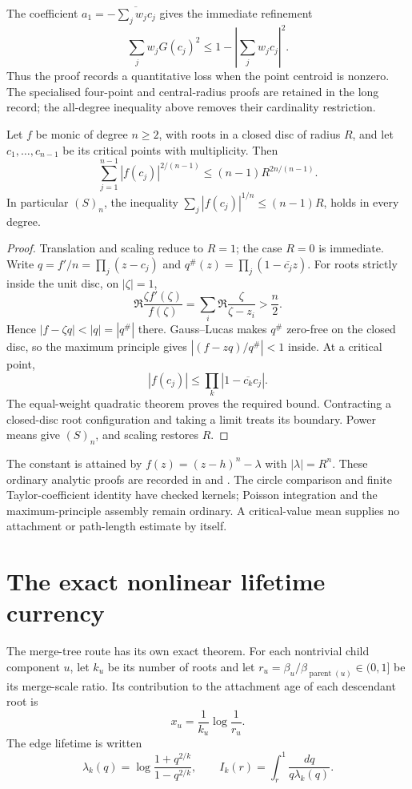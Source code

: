 \documentclass[11pt]{article}
\begin{document}
The coefficient $a_1=-\overline{\sum_jw_jc_j}$ gives the immediate refinement
\[
 \sum_jw_jG(c_j)^2\le1-\left|\sum_jw_jc_j\right|^2.
\]
Thus the proof records a quantitative loss when the point centroid is nonzero.
The specialised four-point and central-radius proofs are retained in the long
record; the all-degree inequality above removes their cardinality restriction.

\begin{theorem}\label{res:fp-to-s}
Let $f$ be monic of degree $n\ge2$, with roots in a closed disc of radius
$R$, and let $c_1,\ldots,c_{n-1}$ be its critical points with multiplicity.
Then
\[
 \sum_{j=1}^{n-1}|f(c_j)|^{2/(n-1)}
 \le(n-1)R^{2n/(n-1)}.
\]
In particular $(S)_n$, the inequality
$\sum_j|f(c_j)|^{1/n}\le(n-1)R$, holds in every degree.
\end{theorem}

\begin{proof}
Translation and scaling reduce to $R=1$; the case $R=0$ is immediate.
Write $q=f'/n=\prod_j(z-c_j)$ and
$q^\#(z)=\prod_j(1-\overline{c_j}z)$.
For roots strictly inside the unit disc, on $|\zeta|=1$,
\[
 \Re\frac{\zeta f'(\zeta)}{f(\zeta)}
 =\sum_i\Re\frac{\zeta}{\zeta-z_i}>\frac n2.
\]
Hence $|f-\zeta q|<|q|=|q^\#|$ there.  Gauss--Lucas makes $q^\#$ zero-free
on the closed disc, so the maximum principle gives
$|(f-zq)/q^\#|<1$ inside.  At a critical point,
\[
 |f(c_j)|\le\prod_k|1-\overline{c_k}c_j|.
\]
The equal-weight quadratic theorem proves the required bound.
Contracting a closed-disc root configuration and taking a limit treats its
boundary.  Power means give $(S)_n$, and scaling restores $R$.
\end{proof}

The constant is attained by $f(z)=(z-h)^n-\lambda$ with $|\lambda|=R^n$.
These ordinary analytic proofs are recorded in
 and
.
The circle comparison and finite Taylor-coefficient identity have checked
kernels; Poisson integration and the maximum-principle assembly remain ordinary.
A critical-value mean supplies no attachment or path-length estimate by itself.

\section{The exact nonlinear lifetime currency}
\label{sec:orlicz}

The merge-tree route has its own exact theorem.  For each nontrivial child
component $u$, let $k_u$ be its number of roots and let
$r_u=\beta_u/\beta_{\operatorname{parent}(u)}\in(0,1]$ be its merge-scale
ratio.  Its contribution to the attachment age of each descendant root is
\[
 x_u=\frac1{k_u}\log\frac1{r_u}.
\]
The edge lifetime is written
\[
 \lambda_k(q)=\log\frac{1+q^{2/k}}{1-q^{2/k}},
 \qquad
 I_k(r)=\int_r^1\frac{dq}{q\lambda_k(q)}.
\]
\end{document}
